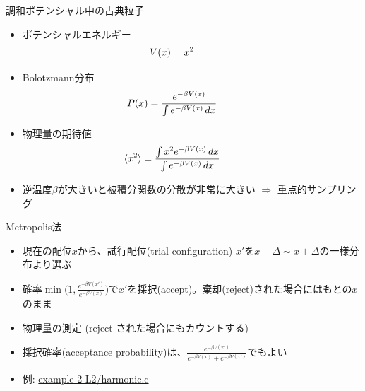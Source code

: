 \begin{frame}[t,fragile]{調和ポテンシャル中の古典粒子}
  \begin{itemize}
    \setlength{\itemsep}{1em}
  \item ポテンシャルエネルギー
    \[ \hspace*{-4em} V(x) = x^2 \]
  \item Bolotzmann分布
    \[ \hspace*{-4em} P(x) = \frac{e^{-\beta V(x)}}{\int e^{-\beta V(x)} \, dx} \]
  \item 物理量の期待値
    \[ \hspace*{-4em} \langle x^2 \rangle = \frac{\int x^2 e^{-\beta V(x)} \, dx}{\int e^{-\beta V(x)} \, dx} \]
  \item 逆温度$\beta$が大きいと被積分関数の分散が非常に大きい $\Rightarrow$ 重点的サンプリング
  \end{itemize}
  \vspace*{-16em} \hfill
\end{frame}

\begin{frame}[t,fragile]{Metropolis法}
  \begin{itemize}
    \setlength{\itemsep}{1em}
  \item 現在の配位$x$から、試行配位(trial configuration) $x'$を$x - \Delta \sim x + \Delta$の一様分布より選ぶ
  \item 確率$\min \Big( 1, \frac{e^{-\beta V(x')}}{e^{-\beta V(x)}} \Big)$で$x'$を採択(accept)。棄却(reject)された場合にはもとの$x$のまま
  \item 物理量の測定 (reject された場合にもカウントする)
  \item 採択確率(acceptance probability)は、$\frac{e^{-\beta V(x')}}{e^{-\beta V(x)}+e^{-\beta V(x')}}$でもよい
  \item 例: \href{https://github.com/todo-group/computer-experiments/blob/master/exercise/monte_carlo/harmonic.c}{example-2-L2/harmonic.c}
  \end{itemize}
\end{frame}

